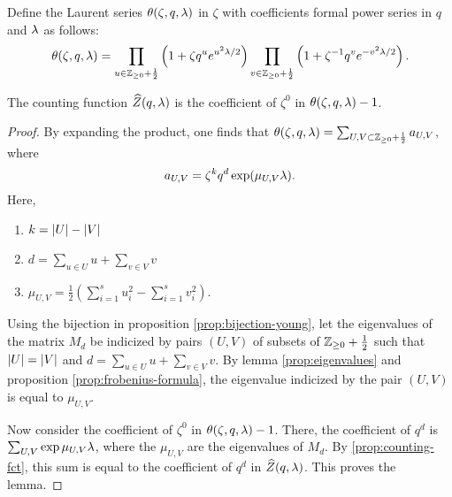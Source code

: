 \begin{defi}
 Define the Laurent series $\theta(\zeta,q,\lambda)$ in $\zeta$ with coefficients formal power series in $q$ and $\lambda$ as follows:
 \[
  \theta(\zeta,q,\lambda) = \prod_{u\in\mathbb{Z}_{\geq 0}+\frac{1}{2}} \left(1+\zeta q^u e^{u^2\lambda/2}\right) \prod_{v\in\mathbb{Z}_{\geq 0}+\frac{1}{2}} \left(1+\zeta^{-1} q^v e^{-v^2\lambda/2}\right).
 \]
\end{defi}

\begin{lemma} \label{prop:theta-expansion}
 The counting function $\widehat{Z}(q,\lambda)$ is the coefficient of $\zeta^0$ in $\theta(\zeta,q,\lambda)-1$.
\end{lemma}
\begin{proof}
 By expanding the product, one finds that $\theta(\zeta,q,\lambda)=\sum_{U,V\subset\mathbb{Z}_{\geq 0}+\frac{1}{2}}a_{U,V}$, where \[a_{U,V}=\zeta^k q^d \exp(\mu_{U,V}\lambda).\] Here, \begin{enumerate} \item $k=|U|-|V|$
 \item $d=\sum_{u\in U}u + \sum_{v\in V}v$
 \item $\mu_{U,V}=\frac{1}{2}\left(\sum_{i=1}^s u_i^2 - \sum_{i=1}^s v_i^2\right)$.
 \end{enumerate}
Using the bijection in proposition \ref{prop:bijection-young}, let the eigenvalues of the matrix $M_d$ be indicized by pairs $(U,V)$ of subsets of $\mathbb{Z}_{\geq 0}+\frac{1}{2}$ such that $|U|=|V|$ and $d=\sum_{u\in U}u + \sum_{v\in V}v$. By lemma \ref{prop:eigenvalues} and proposition \ref{prop:frobenius-formula}, the eigenvalue indicized by the pair $(U,V)$ is equal to $\mu_{U,V}$.

Now consider the coefficient of $\zeta^0$ in $\theta(\zeta,q,\lambda)-1$. There, the coefficient of $q^d$ is $\sum_{U,V}\exp{\mu_{U,V}\lambda}$, where the $\mu_{U,V}$ are the eigenvalues of $M_d$. By \ref{prop:counting-fct}, this sum is equal to the coefficient of $q^d$ in $\widehat{Z}(q,\lambda)$. This proves the lemma.
\end{proof}


